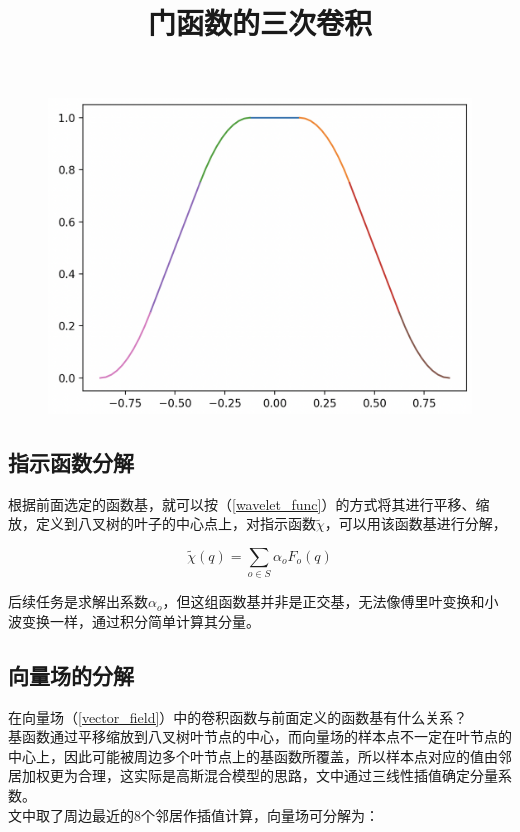 			\begin{figure}[H]
				\begin{center}
					\includegraphics[scale=0.8]{images/p_2.png}
					\title{门函数的三次卷积}
				\end{center}
			\end{figure}

	\subsection{指示函数分解}
		根据前面选定的函数基，就可以按（\ref{wavelet_func}）的方式将其进行平移、缩放，定义到八叉树的叶子的中心点上，对指示函数$\tilde{\chi}$，可以用该函数基进行分解，

		$$
			\tilde{\chi}(q) = \sum_{o \in S} \alpha_{o} F_o(q)
		$$

		后续任务是求解出系数${\alpha_{o}}$，但这组函数基并非是正交基，无法像傅里叶变换和小波变换一样，通过积分简单计算其分量。

	\subsection{向量场的分解}
		在向量场（\ref{vector_field}）中的卷积函数与前面定义的函数基有什么关系？\\

		基函数通过平移缩放到八叉树叶节点的中心，而向量场的样本点不一定在叶节点的中心上，因此可能被周边多个叶节点上的基函数所覆盖，所以样本点对应的值由邻居加权更为合理，这实际是高斯混合模型的思路，文中通过三线性插值确定分量系数。\\

		文中取了周边最近的8个邻居作插值计算，向量场可分解为：

